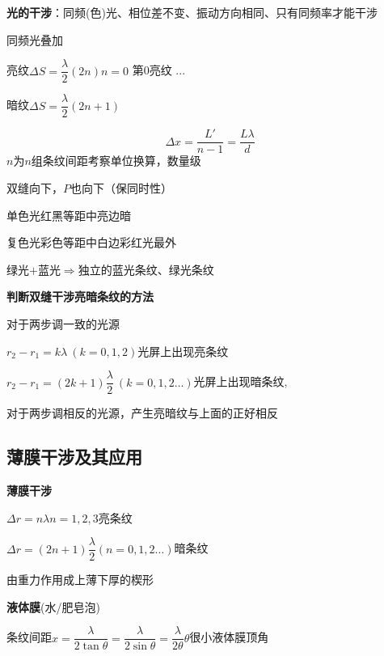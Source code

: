 \textbf{光的干涉}：同频(色)光、相位差不变、振动方向相同、只有同频率才能干涉

\quad 同频光叠加


亮纹\quad $\Delta S=\dfrac{\lambda}{2}(2n)$\quad $n=0$ 第0亮纹 ...

暗纹\quad $\Delta S=\dfrac{\lambda}{2}(2n+1)$\quad {}

\[\Delta x=\frac{L'}{n-1}=\frac{L\lambda}{d}\] %
$n$为$n$组条纹间距\quad 考察单位换算，数量级 %

双缝向下，$P$也向下（保同时性）

单色光\quad 红黑等距\quad 中亮边暗

复色光\quad 彩色等距\quad 中白边彩\quad 红光最外

绿光$+$蓝光$\Rightarrow$独立的蓝光条纹、绿光条纹

\textbf{判断双缝干涉亮暗条纹的方法}


对于两步调一致的光源 %

$r_2-r_1=k\lambda\ (k=0,1,2)$\quad 光屏上出现亮条纹 %

$r_2-r_1=(2k+1)\dfrac{\lambda}{2}\ (k=0,1,2\ldots)$\quad 光屏上出现暗条纹,

对于两步调相反的光源，产生亮暗纹与上面的正好相反

\subsection{薄膜干涉及其应用}
\textbf{薄膜干涉}


$\Delta r=n\lambda$\quad $n=1,2,3$\quad 亮条纹

$\Delta r=(2n+1)\dfrac{\lambda}{2}$\quad $(n=0,1,2\ldots)$\quad 暗条纹

由重力作用成上薄下厚的楔形

\textbf{液体膜}(水/肥皂泡)

条纹间距\quad $x=\dfrac{\lambda}{2\tan\theta}=\dfrac{\lambda}{2\sin\theta}=\dfrac{\lambda}{2\theta}$\quad $\theta$很小\quad 液体膜顶角

